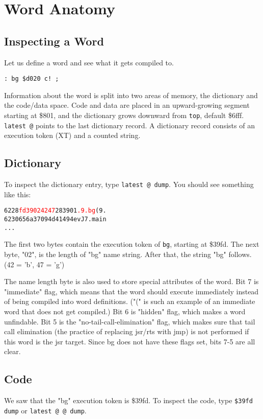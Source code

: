 \chapter{Word Anatomy}

\section{Inspecting a Word}

Let us define a word and see what it gets compiled to.

\begin{verbatim}
: bg $d020 c! ;
\end{verbatim}

Information about the word is split into two areas of memory, the dictionary and the code/data space. Code and data are placed in an upward-growing segment starting at \$801, and the dictionary grows downward from \texttt{top}, default \$6fff. \texttt{latest @} points to the last dictionary record. A dictionary record consists of an execution token (XT) and a counted string.

\section{Dictionary}
To inspect the dictionary entry, type \texttt{latest @ dump}. You should see something like this:

\begin{alltt}
6228  \textcolor{red}{fd 39 02 42 47} 28 39 01 \textcolor{red}{.9.bg}(9.
6230  65 6a 37 09 4d 41 49 4e vJ7.main
...
\end{alltt}

The first two bytes contain the execution token of \texttt{bg}, starting at \$39fd. The next byte, "02", is the length of "bg" name string. After that, the string "bg" follows. (42 = 'b', 47 = 'g')

The name length byte is also used to store special attributes of the word. Bit 7 is "immediate" flag, which means that the word should execute immediately instead of being compiled into word definitions. ("(" is such an example of an immediate word that does not get compiled.) Bit 6 is "hidden" flag, which makes a word unfindable. Bit 5 is the "no-tail-call-elimination" flag, which makes sure that tail call elimination (the practice of replacing jsr/rts with jmp) is not performed if this word is the jsr target. Since bg does not have these flags set, bits 7-5 are all clear.

\section{Code}
We saw that the "bg" execution token is \$39fd. To inspect the code, type \texttt{\$39fd dump} or \texttt{latest @ @ dump}.

